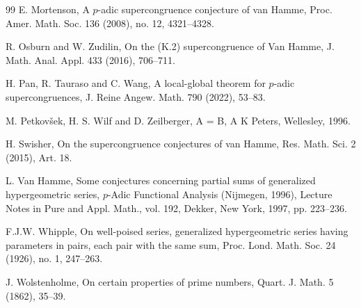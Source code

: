 \documentclass[12pt,reqno]{amsart}
\theoremstyle{plain}
\theoremstyle{definition}
\theoremstyle{remark}
\numberwithin{equation}{section}
\begin{document}
\begin{thebibliography}{99}
 E. Mortenson, A $p$-adic supercongruence conjecture of van Hamme, Proc.
Amer. Math. Soc. 136 (2008), no. 12, 4321--4328.

 R. Osburn and W. Zudilin, On the (K.2) supercongruence of Van Hamme, J. Math. Anal. Appl. 433 (2016), 706--711.

 H. Pan, R. Tauraso and C. Wang, A local-global theorem for $p$-adic supercongruences, J. Reine Angew. Math. 790 (2022), 53--83.

 M. Petkov\v{s}ek, H. S. Wilf and D. Zeilberger, A = B, A K Peters, Wellesley, 1996.

 H. Swisher, On the supercongruence conjectures of van Hamme, Res. Math.
Sci. 2 (2015), Art. 18.

 L. Van Hamme, Some conjectures concerning partial sums of generalized hypergeometric series, $p$-Adic Functional Analysis (Nijmegen, 1996), Lecture Notes in Pure and Appl. Math., vol. 192, Dekker, New York, 1997, pp. 223--236.

 F.J.W. Whipple, On well-poised series, generalized hypergeometric series having parameters in pairs, each pair with the same sum, Proc. Lond. Math. Soc. 24 (1926), no. 1, 247--263.

 J. Wolstenholme, On certain properties of prime numbers, Quart. J. Math. 5 (1862), 35--39.
\end{thebibliography}
\end{document}
